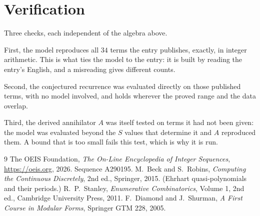 \documentclass[11pt,a4paper]{article}
\theoremstyle{plain}
\theoremstyle{definition}
\begin{document}
\section{Verification}

Three checks, each independent of the algebra above.

First, the model reproduces all $34$ terms the entry publishes, exactly, in integer
arithmetic. This is what ties the model to the entry: it is built by reading the entry's
English, and a misreading gives different counts.

Second, the conjectured recurrence was evaluated directly on those published terms, with no
model involved, and holds wherever the proved range and the data overlap.

Third, the derived annihilator $A$ was itself tested on terms it had not been given: the model
was evaluated beyond the $S$ values that determine it and $A$ reproduced them. A bound that is
too small fails this test, which is why it is run.

\begin{thebibliography}{9}
 The OEIS Foundation, \emph{The On-Line Encyclopedia of Integer
Sequences}, \url{https://oeis.org}, 2026. Sequence A290195.
 M.~Beck and S.~Robins, \emph{Computing the Continuous Discretely},
2nd ed., Springer, 2015. (Ehrhart quasi-polynomials and their periods.)
 R.~P.~Stanley, \emph{Enumerative Combinatorics}, Volume 1, 2nd ed.,
Cambridge University Press, 2011.
 F.~Diamond and J.~Shurman, \emph{A First Course in Modular Forms},
Springer GTM 228, 2005.
\end{thebibliography}
\end{document}

